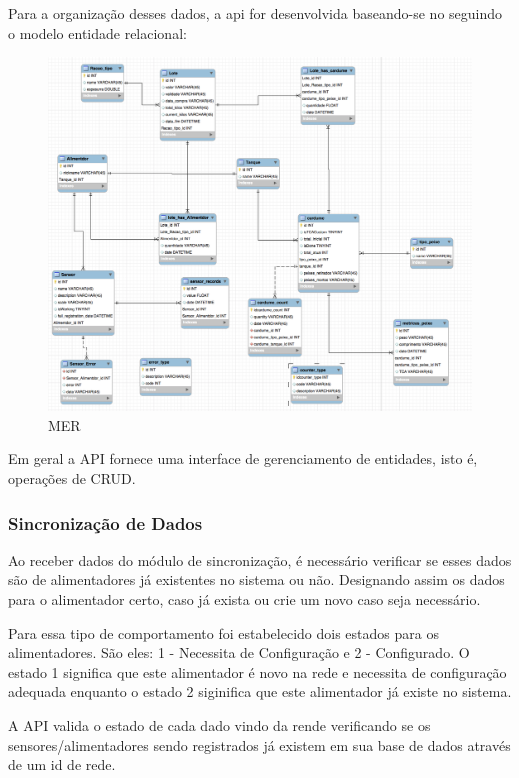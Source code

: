 Para a organização desses dados, a api for desenvolvida baseando-se no seguindo o modelo entidade relacional:

\begin{figure}[H]
    \centering
    \includegraphics[scale=0.5]{figuras/mer}
    \caption{MER}
    \label{fig:mer}
\end{figure}

Em geral a API fornece uma interface de gerenciamento de entidades, isto é, operações de CRUD.

\subsubsection{Sincronização de Dados}

Ao receber dados do módulo de sincronização, é necessário verificar se esses dados são de alimentadores já existentes no sistema ou não. Designando assim os dados para o alimentador certo, caso já exista ou crie um novo caso seja necessário.

Para essa tipo de comportamento foi estabelecido dois estados para os alimentadores. São eles: 1 - Necessita de Configuração e 2 - Configurado. O estado 1 significa que este alimentador é novo na rede e necessita de configuração adequada enquanto o estado 2 siginifica que este alimentador já existe no sistema.

A API valida o estado de cada dado vindo da rende verificando se os sensores/alimentadores sendo registrados já existem em sua base de dados através de um id de rede.

